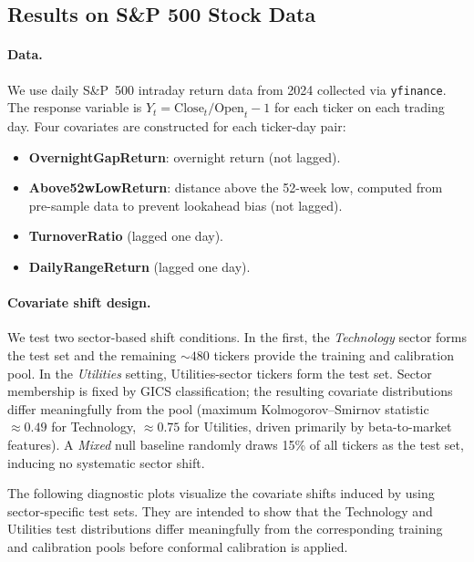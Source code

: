\documentclass{article}
\numberwithin{equation}{section}
\begin{document}
\subsection{Results on S\&P 500 Stock Data}
\label{sec:experiments:finance}

\paragraph{Data.}
We use daily S\&P~500 intraday return data from 2024 collected via
\texttt{yfinance}.  The response variable is
$Y_t = \mathrm{Close}_t / \mathrm{Open}_t - 1$ for each ticker on each
trading day.  Four covariates are constructed for each ticker-day pair:
%
\begin{itemize}
  \item \textbf{OvernightGapReturn}: overnight return (not lagged).
  \item \textbf{Above52wLowReturn}: distance above the 52-week low, computed
        from pre-sample data to prevent lookahead bias (not lagged).
  \item \textbf{TurnoverRatio} (lagged one day).
  \item \textbf{DailyRangeReturn} (lagged one day).
\end{itemize}

\paragraph{Covariate shift design.}
We test two sector-based shift conditions.  In the first, the
\emph{Technology} sector forms the test set and the remaining $\sim\!480$
tickers provide the training and calibration pool.  In the \emph{Utilities}
setting, Utilities-sector tickers form the test set.  Sector membership is
fixed by GICS classification; the resulting covariate distributions differ
meaningfully from the pool (maximum Kolmogorov–Smirnov statistic $\approx
0.49$ for Technology, $\approx 0.75$ for Utilities, driven primarily by
beta-to-market features).  A \emph{Mixed} null baseline randomly draws 15\%
of all tickers as the test set, inducing no systematic sector shift.

The following diagnostic plots visualize the covariate shifts induced by using sector-specific test sets. They are intended to show that the Technology and Utilities test distributions differ meaningfully from the corresponding training and calibration pools before conformal calibration is applied.
\end{document}
